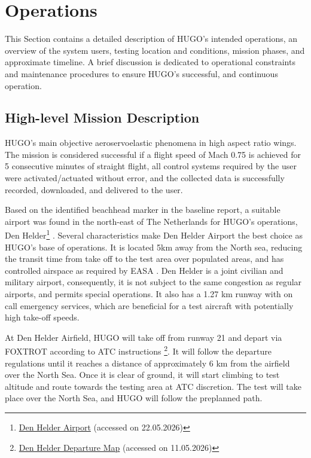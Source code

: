 
\section{Operations}
\label{sec:operations}
This Section contains a detailed description of HUGO's intended operations, an overview of the system users, testing location and conditions, mission phases, and approximate timeline. A brief discussion is dedicated to operational constraints and maintenance procedures to ensure HUGO's successful, and continuous operation.

\subsection{High-level Mission Description}
HUGO's main objective aeroservoelastic phenomena in high aspect ratio wings. The mission is considered successful if a flight speed of Mach 0.75 is achieved for 5 consecutive minutes of straight flight, all control systems required by the user were activated/actuated without error, and the collected data is successfully recorded, downloaded, and delivered to the user.

Based on the identified beachhead marker in the baseline report,  a suitable airport was found in the north-east of The Netherlands for HUGO's operations, Den Helder\footnote{\href{https://denhelderairport.nl/eng/}{Den Helder Airport} (accessed on 22.05.2026)} . Several characteristics make Den Helder Airport the best choice as HUGO's base of operations. It is located 5km away from the North sea, reducing the transit time from take off to the test area over populated areas, and has controlled airspace as required by EASA \cite{EASAInitialAirworthiness2025}.  Den Helder is a joint civilian and military airport, consequently, it is not subject to the same congestion as regular airports, and permits special operations. It also has a 1.27 km runway with on call emergency services, which are beneficial for a test aircraft with potentially high take-off speeds.

At Den Helder Airfield, HUGO will take off from runway 21 and depart via FOXTROT according to ATC instructions \footnote{\href{https://nl.ivao.aero/downloads/specops_loa/ehkd.pdf}{Den Helder Departure Map} (accessed on 11.05.2026)}. It will follow the departure regulations until it reaches a distance of approximately 6 km from the airfield over the North Sea. Once it is clear of ground, it will start climbing to test altitude and route towards the testing area at ATC discretion. The test will take place over the North Sea, and HUGO will follow the preplanned path.


